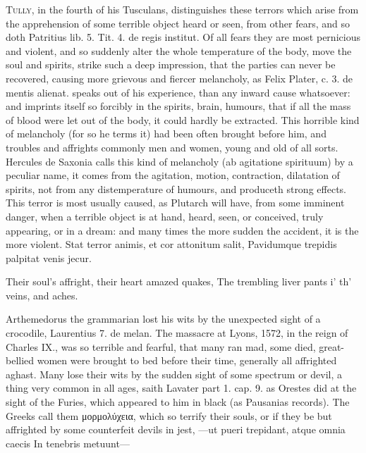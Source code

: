 {\lettrine{T}{ully}, in the fourth of his Tusculans, distinguishes these terrors
which arise from the apprehension of some terrible object heard or
seen, from other fears, and so doth Patritius lib. 5. Tit. 4. de regis
institut. Of all fears they are most pernicious and violent, and so
suddenly alter the whole temperature of the body, move the soul and
spirits, strike such a deep impression, that the parties can never be
recovered, causing more grievous and fiercer melancholy, as Felix
Plater, c. 3. de mentis alienat. speaks out of his experience,
than any inward cause whatsoever: and imprints itself so forcibly in
the spirits, brain, humours, that if all the mass of blood were let out
of the body, it could hardly be extracted. This horrible kind of
melancholy (for so he terms it) had been often brought before him, and
troubles and affrights commonly men and women, young and old of all
sorts. Hercules de Saxonia calls this kind of melancholy (ab
agitatione spirituum) by a peculiar name, it comes from the agitation,
motion, contraction, dilatation of spirits, not from any distemperature
of humours, and produceth strong effects. This terror is most usually
caused, as Plutarch will have, from some imminent danger, when a
terrible object is at hand, heard, seen, or conceived, truly
appearing, or in a dream: and many times the more sudden the
accident, it is the more violent.
Stat terror animis, et cor attonitum salit,
Pavidumque trepidis palpitat venis jecur.

Their soul's affright, their heart amazed quakes,
The trembling liver pants i' th' veins, and aches.

Arthemedorus the grammarian lost his wits by the unexpected sight of a
crocodile, Laurentius 7. de melan. The massacre at Lyons, 1572,
in the reign of Charles IX., was so terrible and fearful, that many ran
mad, some died, great-bellied women were brought to bed before their
time, generally all affrighted aghast. Many lose their wits by
the sudden sight of some spectrum or devil, a thing very common in all
ages, saith Lavater part 1. cap. 9. as Orestes did at the sight of the
Furies, which appeared to him in black (as Pausanias records).
The Greeks call them \textgreek{μορμολύχεια}, which so terrify their souls, or if
they be but affrighted by some counterfeit devils in jest,
---ut pueri trepidant, atque omnia caecis
In tenebris metuunt---

}
